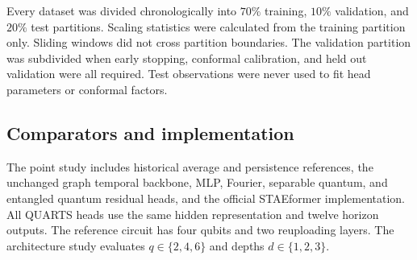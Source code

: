 \documentclass[pdflatex,sn-mathphys-num]{sn-jnl}
\begin{document}
Every dataset was divided chronologically into \(70\%\) training, \(10\%\) validation, and \(20\%\) test partitions. Scaling statistics were calculated from the training partition only. Sliding windows did not cross partition boundaries. The validation partition was subdivided when early stopping, conformal calibration, and held out validation were all required. Test observations were never used to fit head parameters or conformal factors.

\begin{table}[t]
\caption{Target domain data use. Percentages within validation refer to consecutive, nonoverlapping chronological windows. The PeMSD4 subgroup results are descriptive analyses of frozen predictions and do not select or recalibrate a model.}\label{tab:datause}
\centering
\scriptsize
{}
\end{table}

\subsection{Comparators and implementation}\label{subsec:implementation}

The point study includes historical average and persistence references, the unchanged graph temporal backbone, MLP, Fourier, separable quantum, and entangled quantum residual heads, and the official STAEformer implementation. All QUARTS heads use the same hidden representation and twelve horizon outputs. The reference circuit has four qubits and two reuploading layers. The architecture study evaluates \(q\in\{2,4,6\}\) and depths \(d\in\{1,2,3\}\).
\end{document}
